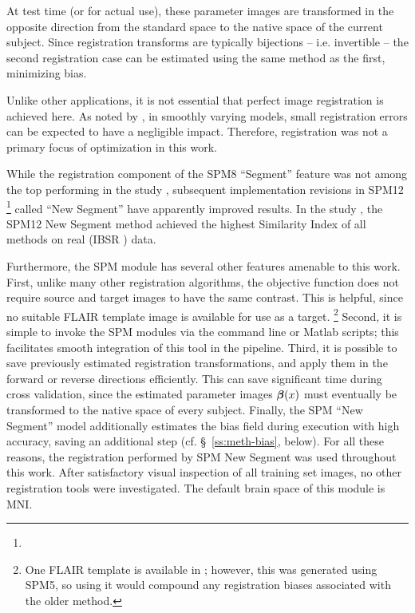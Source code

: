 At test time (or for actual use), these parameter images are transformed in the opposite direction from the standard space to the native space of the current subject.
Since registration transforms are typically bijections -- i.e. invertible -- the second registration case can be estimated using the same method as the first, minimizing bias.
\par
Unlike other applications, it is not essential that perfect image registration is achieved here.
As noted by \citeauthor{Harmouche2015} \cite{Harmouche2015}, in smoothly varying models, small registration errors can be expected to have a negligible impact.
Therefore, registration was not a primary focus of optimization in this work.
\par
While the registration component of the SPM8 ``Segment'' feature \cite{Ashburner2005} was not among the top performing in the \citeyear{Klein2009} study \cite{Klein2009}, subsequent implementation revisions in SPM12%
\footnote{}
called ``New Segment'' have apparently improved results.
In the \citeyear{Kazemi2014} study \cite{Kazemi2014}, the SPM12 New Segment method achieved the highest Similarity Index of all methods on real (IBSR \cite{IBSR}) data.
\par
Furthermore, the SPM module has several other features amenable to this work.
First, unlike many other registration algorithms, the objective function does not require source and target images to have the same contrast.
This is helpful, since no suitable FLAIR template image is available for use as a target.%
\footnote{One FLAIR template is available in \cite{Winkler2012}; however, this was generated using SPM5, so using it would compound any registration biases associated with the older method.}
Second, it is simple to invoke the SPM modules via the command line or Matlab scripts;
this facilitates smooth integration of this tool in the pipeline.
Third, it is possible to save previously estimated registration transformations, and apply them in the forward or reverse directions efficiently.
This can save significant time during cross validation, since the estimated parameter images $\bm{\beta}(x)$ must eventually be transformed to the native space of every subject.
Finally, the SPM ``New Segment'' model additionally estimates the bias field during execution with high accuracy, saving an additional step (cf. \S\ \ref{ss:meth-bias}, below). 
For all these reasons, the registration performed by SPM New Segment was used throughout this work.
After satisfactory visual inspection of all training set images, no other registration tools were investigated.
The default brain space of this module is MNI.
